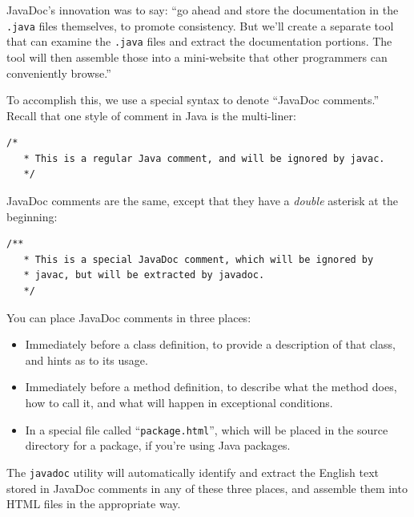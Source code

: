 JavaDoc's innovation was to say: ``go ahead and store the documentation in the
\texttt{.java} files themselves, to promote consistency. But we'll create a
separate tool that can examine the \texttt{.java} files and extract the
documentation portions. The tool will then assemble those into a mini-website
that other programmers can conveniently browse.''

To accomplish this, we use a special syntax to denote ``JavaDoc comments.''
Recall that one style of comment in Java is the multi-liner:

\vspace{-.11in}
\begin{Verbatim}[fontsize=\footnotesize,samepage=true,frame=none]
  /*
   * This is a regular Java comment, and will be ignored by javac.
   */
\end{Verbatim}
\vspace{-.11in}

JavaDoc comments are the same, except that they have a \textit{double}
asterisk at the beginning:

\vspace{-.11in}
\begin{Verbatim}[fontsize=\footnotesize,samepage=true,frame=none]
  /**
   * This is a special JavaDoc comment, which will be ignored by
   * javac, but will be extracted by javadoc.
   */
\end{Verbatim}
\vspace{-.11in}

You can place JavaDoc comments in three places:

\begin{itemize}
\itemsep.1em

\item Immediately before a class definition, to provide a description of that
class, and hints as to its usage.

\item Immediately before a method definition, to describe what the method
does, how to call it, and what will happen in exceptional conditions.

\item In a special file called ``\texttt{package.html}'', which will be placed
in the source directory for a package, if you're using Java packages.

\end{itemize}

The \texttt{javadoc} utility will automatically identify and extract the
English text stored in JavaDoc comments in any of these three places, and
assemble them into HTML files in the appropriate way.

